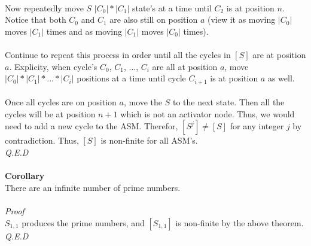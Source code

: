 \documentclass[a4paper,12pt]{article}
\begin{document}
\\
Now repeatedly move $S$ $|C_0|*|C_1|$ state's at a time until $C_2$ is at position $n$. Notice that both $C_0$ and $C_1$ are also still on position $a$ (view it as moving $|C_0|$ moves $|C_1|$ times and as moving $|C_1|$ moves $|C_0|$ times).\\
\\
Continue to repeat this process in order until all the cycles in $[S]$ are at position $a$. Explicity, when cycle's $C_0$, $C_1$, ..., $C_i$ are all at position $a$, move $|C_0|*|C_1|*...*|C_i|$ positions at a time until cycle $C_{i+1}$ is at position $a$ as well.\\
\\
Once all cycles are on position $a$, move the $S$ to the next state. Then all the cycles will be at position $n + 1$ which is not an activator node. Thus, we would need to add a new cycle to the ASM. Therefor, $[S^j] \neq [S]$ for any integer $j$ by contradiction. Thus, $[S]$ is non-finite for all ASM's.\\
\textit{Q.E.D}\\     
\\
\textbf{Corollary}\\
There are an infinite number of prime numbers.\\
\\
\textit{Proof}\\ 
$S_{1,1}$ produces the prime numbers, and $[S_{1,1}]$ is non-finite by the above theorem.\\
\textit{Q.E.D}\\
\end{document}
